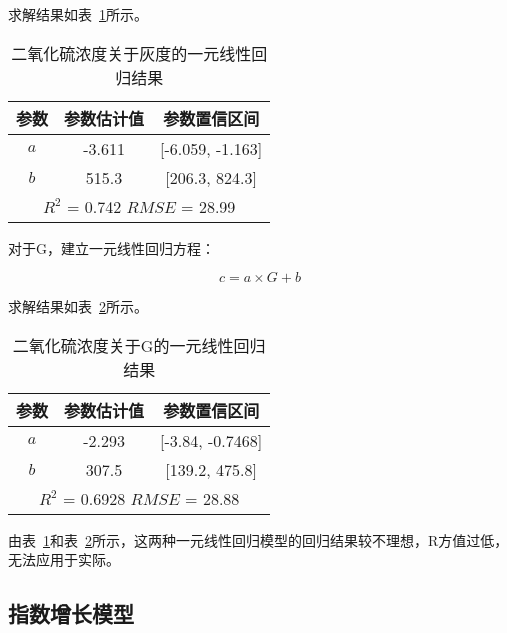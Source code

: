 求解结果如表~\ref{SO2_Gr_linear}所示。

\begin{table}[]
    \centering
    \caption{二氧化硫浓度关于灰度的一元线性回归结果}
    \label{SO2_Gr_linear}
    \begin{tabular}{@{}ccc@{}}
    \toprule
    参数       & 参数估计值      & 参数置信区间                   \\ \midrule
    $a$      & -3.611     & {[}-6.059, -1.163{]}     \\
    $b$      & 515.3      & {[}206.3, 824.3{]}       \\ \midrule
    \multicolumn{3}{c}{$R^2$ = 0.742 $RMSE$ = 28.99} \\ \bottomrule
    \end{tabular}
    \end{table}


对于G，建立一元线性回归方程：

$$c=a \times G+b$$

求解结果如表~\ref{SO2_G_linear}所示。

\begin{table}[]
    \centering
    \caption{二氧化硫浓度关于G的一元线性回归结果}
    \label{SO2_G_linear}
    \begin{tabular}{@{}ccc@{}}
    \toprule
    参数       & 参数估计值      & 参数置信区间                   \\ \midrule
    $a$      & -2.293     & {[}-3.84, -0.7468{]}     \\
    $b$      & 307.5      & {[}139.2, 475.8{]}       \\ \midrule
    \multicolumn{3}{c}{$R^2$ = 0.6928 $RMSE$ = 28.88} \\ \bottomrule
    \end{tabular}
\end{table}


由表~\ref{SO2_Gr_linear}和表~\ref{SO2_G_linear}所示，这两种一元线性回归模型的回归结果较不理想，R方值过低，无法应用于实际。

\subsection{指数增长模型}

